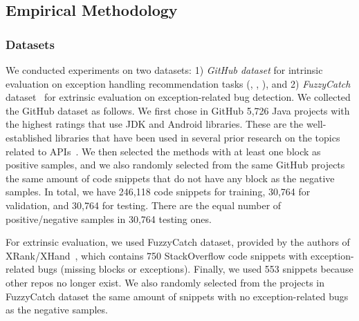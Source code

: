\vspace{-6pt}
\subsection{Empirical Methodology}

\subsubsection{Datasets}


We conducted experiments on two datasets: 1) {\em GitHub dataset}
for intrinsic evaluation on exception handling recommendation tasks
({\xblock}, {\xstate}, {\xtype}), and 2) {\em FuzzyCatch}
dataset~\cite{xrank-fse20} for extrinsic evaluation on
exception-related bug detection.
%
%
We collected the GitHub dataset as follows. We first chose in GitHub
5,726 Java projects with the highest ratings that use
JDK and Android libraries.
These are the well-established libraries that have been used in
several prior research on the topics related to
APIs~\cite{icse18,liveapi14}.
%
We then selected the methods with at least one  block
as positive samples, and we also randomly selected from the same
GitHub projects the same amount of code snippets that do not have any
 block as the negative samples. In total, we have 246,118
code snippets for training, 30,764 for validation, and 30,764 for
testing. There are the equal number of positive/negative samples in
30,764 testing ones.



For extrinsic evaluation, we used FuzzyCatch dataset, provided by the
authors of XRank/XHand~\cite{xrank-fse20}, which contains 750
StackOverflow code snippets with exception-related bugs (missing
 blocks or exceptions). Finally, we used 553 snippets
because other repos no longer exist. We also randomly selected from
the projects in FuzzyCatch dataset the same amount of snippets with no
exception-related bugs as the negative samples.


